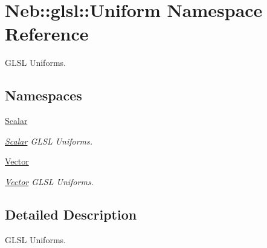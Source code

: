 \hypertarget{namespaceNeb_1_1glsl_1_1Uniform}{\section{Neb\-:\-:glsl\-:\-:Uniform Namespace Reference}
\label{namespaceNeb_1_1glsl_1_1Uniform}
}


G\-L\-S\-L Uniforms.  


\subsection*{Namespaces}
\begin{DoxyCompactItemize}
\item 
\hyperlink{namespaceNeb_1_1glsl_1_1Uniform_1_1Scalar}{Scalar}
\begin{DoxyCompactList}\small\item\em \hyperlink{namespaceNeb_1_1glsl_1_1Uniform_1_1Scalar}{Scalar} G\-L\-S\-L Uniforms. \end{DoxyCompactList}\item 
\hyperlink{namespaceNeb_1_1glsl_1_1Uniform_1_1Vector}{Vector}
\begin{DoxyCompactList}\small\item\em \hyperlink{namespaceNeb_1_1glsl_1_1Uniform_1_1Vector}{Vector} G\-L\-S\-L Uniforms. \end{DoxyCompactList}\end{DoxyCompactItemize}


\subsection{Detailed Description}
G\-L\-S\-L Uniforms. 